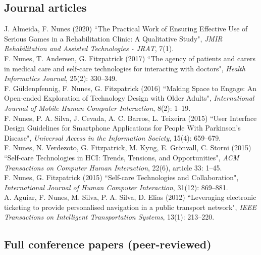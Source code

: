 \documentclass[11pt, a4paper]{article} %
\newcommand{\years}[1]{\marginnote{\scriptsize #1}} %
\begin{document}
\subsection*{Journal articles}

\years{2020}J. Almeida, F. Nunes (2020) ``The Practical Work of Ensuring Effective Use of Serious Games in a Rehabilitation Clinic: A Qualitative Study", \emph{JMIR Rehabilitation and Assisted Technologies - JRAT}, 7(1).\\
\years{2017}F. Nunes, T. Andersen, G. Fitzpatrick (2017) ``The agency of patients and carers in medical care and self-care technologies for interacting with doctors", \emph{Health Informatics Journal}, 25(2): 330--349.\\
\years{2016}F. Güldenpfennig, F. Nunes, G. Fitzpatrick (2016) ``Making Space to Engage: An Open-ended Exploration of Technology Design with Older Adults", \emph{International Journal of Mobile Human Computer Interaction}, 8(2): 1--19.\\
\years{2016}F. Nunes, P. A. Silva, J. Cevada, A. C. Barros, L. Teixeira (2015) ``User Interface Design Guidelines for Smartphone Applications for People With Parkinson's Disease", \emph{Universal Access in the Information Society}, 15(4): 659--679.\\
\years{2015}F. Nunes, N. Verdezoto, G. Fitzpatrick, M. Kyng, E. Grönvall, C. Storni (2015) ``Self-care Technologies in HCI: Trends, Tensions, and Opportunities", \emph{ACM Transactions on Computer Human Interaction}, 22(6), article 33: 1--45.\\
\years{2015}F. Nunes, G. Fitzpatrick (2015) ``Self-care Technologies and Collaboration", \emph{International Journal of Human Computer Interaction}, 31(12): 869--881.\\
\years{2012}A. Aguiar, F. Nunes, M. Silva, P. A. Silva, D. Elias (2012) ``Leveraging electronic ticketing to provide personalised navigation in a public transport network", \emph{IEEE Transactions on Intelligent Transportation Systems}, 13(1): 213--220.


\subsection*{Full conference papers (peer-reviewed)}
\end{document}
